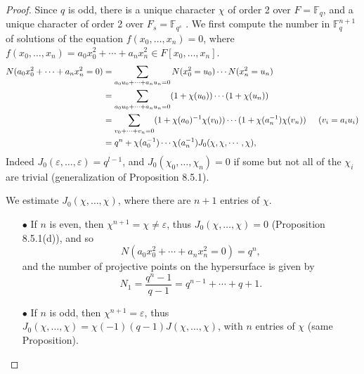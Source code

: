 \documentclass[11pt,a4paper]{article}
\newcommand{\F}{\mathbb{F}}
\begin{document}
\begin{proof}
Since $q$ is odd, there is a unique character $\chi$ of order 2 over $F = \F_q$, and a unique character of order 2 over $F_s = \F_{q^s}$ . We first compute the number in $\F_q^{n+1}$ of solutions of the equation $f(x_0,\ldots,x_n) = 0$, where $f(x_0,\ldots,x_n) = a_0x_0^2+\cdots+a_n x_n^2\in F[x_0,\ldots,x_n]$.
\begin{align*}
N(a_0x_0^2+\cdots+a_n x_n^2=0)&=\sum\limits_{a_0u_0+\cdots+a_n u_n=0}N(x_0^2=u_0)\cdots N(x_n^2=u_n)\\
&=\sum\limits_{a_0u_0+\cdots+a_n u_n=0}(1+\chi(u_0))\cdots(1+\chi(u_n)) \\
&=\sum\limits_{v_0+\cdots+v_n=0}(1+\chi(a_0)^{-1}\chi(v_0))\cdots(1+\chi(a_n^{-1})\chi(v_n)) \hspace{0.5cm}(v_i = a_i u_i)\\
&=q^{n} + \chi(a_0^{-1})\cdots\chi(a_n^{-1})J_0(\chi,\chi,\cdots,\chi),
\end{align*}
Indeed $J_0(\varepsilon,\ldots,\varepsilon) = q^{l-1}$, and $J_0(\chi_0,\ldots,\chi_n)= 0$ if some but not all of the $\chi_i$ are trivial (generalization of Proposition 8.5.1).

We estimate $J_0(\chi,\ldots,\chi)$, where there are $n+1$ entries of $\chi$.

\begin{enumerate}
\item[$\bullet$] If $n$ is even, then $\chi^{n+1} = \chi \ne \varepsilon$, thus $J_0(\chi,\ldots,\chi) = 0$ (Proposition 8.5.1(d)), and so
$$N(a_0x_0^2+\cdots+a_n x_n^2=0) = q^{n},$$
and the number of projective points on the hypersurface is given by 
$$N_1 = \frac{q^n -1}{q-1} = q^{n-1} + \cdots + q + 1.$$
\item[$\bullet$] If $n$ is odd, then $\chi^{n+1} = \varepsilon$, thus $J_0(\chi,\ldots,\chi) = \chi(-1)(q-1) J(\chi,\ldots,\chi)$, with $n$ entries of $\chi$ (same Proposition).


\end{enumerate}
\end{proof}
\end{document}
